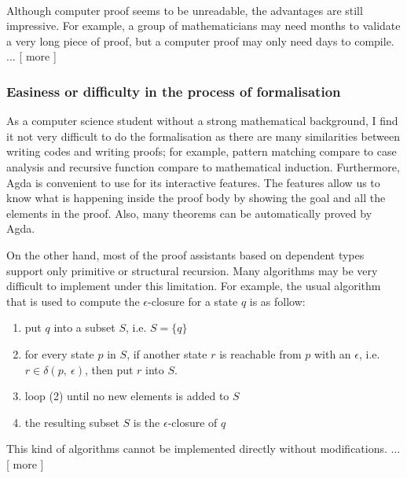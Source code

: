 \paragraph{} Although computer proof seems to be unreadable, the advantages
are still impressive. For example, a group
of mathematicians may need months to validate a very long piece of
proof, but a computer proof may only need days to
compile. ... [ more ]


\subsubsection{Easiness or difficulty in the process of formalisation}
\par As a computer science student without a strong mathematical
background, I find it not very difficult to do the
formalisation as there are many similarities between writing codes and writing
proofs; for example, pattern matching compare to case analysis and
recursive function compare to mathematical induction. Furthermore, Agda is convenient
to use for its interactive features. The features allow us to know
what is happening inside the proof body by showing the goal and all the
elements in the proof. Also, many theorems can be automatically proved
by Agda. 
\par On the other hand, most of the
proof assistants based on dependent types support only primitive or
structural recursion. Many algorithms may be very difficult to
implement under this limitation. For example, the usual algorithm that
is used to compute the \(\epsilon\)-closure for a state \(q\) is as follow:
\begin{enumerate}[nolistsep]
  \item put \(q\) into a subset \(S\), i.e. \(S = \{q\}\)
  \item for every state \(p\) in \(S\), if another state \(r\) is
    reachable from \(p\) with an \(\epsilon\), i.e. \(r \in
        \delta (p,\ \epsilon)\), then put \(r\) into \(S\). 
  \item loop (2) until no new elements is added to \(S\)
  \item the resulting subset \(S\) is the $\epsilon$-closure of \(q\)
\end{enumerate}

\par This kind of algorithms cannot be implemented directly without
modifications. ... [ more ]



